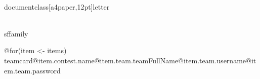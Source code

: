 \\documentclass[a4paper,12pt]{letter}
\begin{document}
\\sffamily

@for(item <- items) {
\\teamcard{@{item.contest.name}}{@{item.team.teamFullName}}{@{item.team.username}}{@{item.team.password}}
}

\
\end{document}

